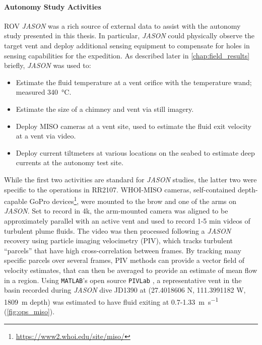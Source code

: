 \paragraph{Autonomy Study Activities}
ROV \emph{JASON} was a rich source of external data to assist with the autonomy study presented in this thesis. In particular, \emph{JASON} could physically observe the target vent and deploy additional sensing equipment to compensate for holes in \Sentry sensing capabilities for the expedition. As described later in \cref{chap:field_results} briefly, \emph{JASON} was used to:
\begin{itemize}
  \item Estimate the fluid temperature at a vent orifice with the temperature wand; measured \SI{340}{\celsius}.
  \item Estimate the size of a chimney and vent via still imagery.
  \item Deploy MISO cameras at a vent site, used to estimate the fluid exit velocity at a vent via video.
  \item Deploy current tiltmeters at various locations on the seabed to estimate deep currents at the autonomy test site.
\end{itemize}

While the first two activities are standard for \emph{JASON} studies, the latter two were specific to the operations in RR2107. 
WHOI-MISO cameras, self-contained depth-capable GoPro devices\footnote{\url{https://www2.whoi.edu/site/miso/}}, were mounted to the brow and one of the arms on \emph{JASON}. Set to record in 4k, the arm-mounted camera was aligned to be approximately parallel with an active vent and used to record 1-5 min videos of turbulent plume fluids. The video was then processed following a \emph{JASON} recovery using particle imaging velocimetry \autocite{zhang2019time} (PIV), which tracks turbulent ``parcels'' that have high cross-correlation between frames. By tracking many specific parcels over several frames, PIV methods can provide a vector field of velocity estimates, that can then be averaged to provide an estimate of mean flow in a region. Using \verb|MATLAB|'s open source \verb|PIVLab| \autocite{thielicke2021particle,thielicke2014pivlab,thielicke2014flapping}, a representative vent in the basin recorded during \emph{JASON} dive JD1390 at (27.4018606 N, 111.3991182 W, \SI{1809}{\meter} depth) was estimated to have fluid exiting at 0.7-\SI{1.33}{\meter\per\second} (\cref{fig:ops_miso}).


